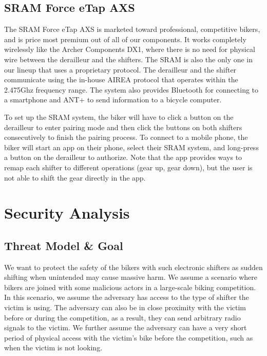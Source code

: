 \documentclass[letterpaper,twocolumn,10pt]{article}
\begin{document}
\subsection{SRAM Force eTap AXS}
The SRAM Force eTap AXS \cite{etap} is marketed toward professional, competitive bikers, and is price most premium out of all of our components. It works completely wirelessly like the Archer Components DX1, where there is no need for physical wire between the derailleur and the shifters. The SRAM is also the only one in our lineup that uses a proprietary protocol. The derailleur and the shifter communicate using the in-house AIREA protocol that operates within the 2.475Ghz frequency range. The system also provides Bluetooth for connecting to a smartphone and ANT+ to send information to a bicycle computer.

To set up the SRAM system, the biker will have to click a button on the derailleur to enter pairing mode and then click the buttons on both shifters consecutively to finish the pairing process. To connect to a mobile phone, the biker will start an app on their phone, select their SRAM system, and long-press a button on the derailleur to authorize. Note that the app provides ways to remap each shifter to different operations (gear up, gear down), but the user is not able to shift the gear directly in the app.




\section{Security Analysis}



\subsection{Threat Model \& Goal}
We want to protect the safety of the bikers with such electronic shifters as sudden shifting when unintended may cause massive harm. We assume a scenario where bikers are joined with some malicious actors in a large-scale biking competition. In this scenario, we assume the adversary has access to the type of shifter the victim is using. The adversary can also be in close proximity with the victim before or during the competition, as a result, they can send arbitrary radio signals to the victim. We further assume the adversary can have a very short period of physical access with the victim's bike before the competition, such as when the victim is not looking.
\end{document}

